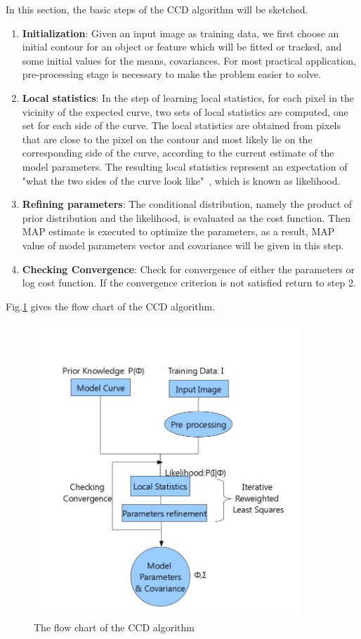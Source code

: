 In this section, the basic steps of the CCD algorithm will be
sketched. 
\begin{enumerate}
\item \textbf{Initialization}: Given an input image as training data, we first choose an initial
contour for an object or feature which will be fitted or tracked, and
some initial values for the means, covariances. For most practical
application, pre-processing stage is necessary to make the problem
easier to solve. 
\item \textbf{Local statistics}: In the step of learning local
  statistics, for each pixel in the
vicinity of the expected curve, two sets of local statistics
are computed, one set for each side of the curve. The local statistics are obtained from
pixels that are close to the pixel on the contour and most likely lie
on the corresponding side of the curve, according to the current
estimate of the model parameters. The resulting local statistics
represent an expectation of "what the two sides of the curve look
like"~\cite{hanek2004contracting}, which is known as likelihood.
\item \textbf{Refining parameters}: The conditional distribution, namely
  the product of prior distribution and  the likelihood, is evaluated
  as the cost function. Then MAP estimate is executed to optimize the
  parameters, as a result, MAP value of model parameters vector and
  covariance will be given in this step.
\item \textbf{Checking Convergence}: Check for convergence of either
  the parameters or log cost function. If the convergence criterion is
  not satisfied return to step 2.
\end{enumerate}
Fig.\ref{fig:flowchart} gives the flow chart of the CCD algorithm.
\begin{figure}[htb]
  \centering
  \includegraphics[width=10cm]{images/flowchart.jpg}
  \caption[The flow chart of
  the CCD algorithm ]{The flow chart of the CCD algorithm}
  \label{fig:flowchart}
\end{figure}


